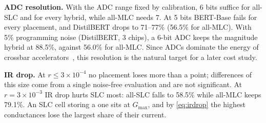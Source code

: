 \textbf{ADC resolution.} With the ADC range fixed by calibration, 6 bits suffice for all-SLC and for every
hybrid, while all-MLC needs 7. At 5 bits BERT-Base fails for every placement, and DistilBERT drops to
71--77\% (56.5\% for all-MLC). With 5\% programming noise (DistilBERT, 3 chips), a 6-bit ADC keeps the magnitude hybrid at
88.5\%, against 56.0\% for all-MLC. Since ADCs dominate the energy of crossbar
accelerators~\cite{shafiee2016isaac}, this resolution is the natural target for a later cost study.

\textbf{IR drop.} At $r\leq3\times10^{-4}$ no placement loses more than a point; differences of this size
come from a single noise-free evaluation and are not significant. At $r=3\times10^{-3}$ IR drop hurts SLC
most: all-SLC falls to 58.5\% while all-MLC keeps 79.1\%. An SLC cell storing a one sits at $G_{\max}$, and
by \cref{eq:irdrop} the highest conductances lose the largest share of their current.

